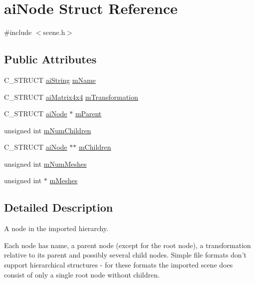 \hypertarget{structaiNode}{\section{ai\-Node \-Struct \-Reference}
\label{structaiNode}
}


{\ttfamily \#include $<$scene.\-h$>$}

\subsection*{\-Public \-Attributes}
\begin{DoxyCompactItemize}
\item 
\-C\-\_\-\-S\-T\-R\-U\-C\-T \hyperlink{structaiString}{ai\-String} \hyperlink{structaiNode_afa528a7e43e15d92a920229b1ff094f6}{m\-Name}
\item 
\-C\-\_\-\-S\-T\-R\-U\-C\-T \hyperlink{structaiMatrix4x4}{ai\-Matrix4x4} \hyperlink{structaiNode_aadb69c766c7658bba9d2195af16d6831}{m\-Transformation}
\item 
\-C\-\_\-\-S\-T\-R\-U\-C\-T \hyperlink{structaiNode}{ai\-Node} $\ast$ \hyperlink{structaiNode_aa6896b42c78e784db85d822a4c8dd404}{m\-Parent}
\item 
unsigned int \hyperlink{structaiNode_af5030494b156ec54632e6182a6e386ca}{m\-Num\-Children}
\item 
\-C\-\_\-\-S\-T\-R\-U\-C\-T \hyperlink{structaiNode}{ai\-Node} $\ast$$\ast$ \hyperlink{structaiNode_ac700679f0d4971f124e8444f68057291}{m\-Children}
\item 
unsigned int \hyperlink{structaiNode_a7a411079096f86d1e96b6368d237d897}{m\-Num\-Meshes}
\item 
unsigned int $\ast$ \hyperlink{structaiNode_acd1706d6508b31916c18e39b7085ca63}{m\-Meshes}
\end{DoxyCompactItemize}


\subsection{\-Detailed \-Description}
\-A node in the imported hierarchy.

\-Each node has name, a parent node (except for the root node), a transformation relative to its parent and possibly several child nodes. \-Simple file formats don't support hierarchical structures -\/ for these formats the imported scene does consist of only a single root node without children. 

